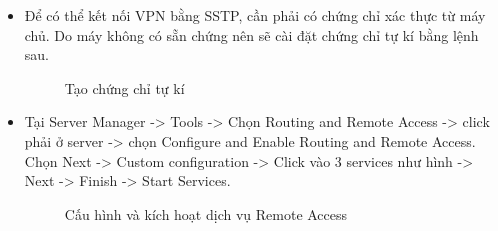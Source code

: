 \begin{itemize}
    \item Để có thể kết nối VPN bằng SSTP, cần phải có chứng chỉ xác thực từ máy chủ. Do máy không có sẵn chứng nên sẽ cài đặt chứng chỉ tự kí bằng lệnh sau.
    \begin{figure}[htbp]
            \hfill
            \hfill
            \caption{Tạo chứng chỉ tự kí}
        \end{figure}
    \item Tại Server Manager -> Tools -> Chọn Routing and Remote Access -> click phải ở server -> chọn Configure and Enable Routing and Remote Access. Chọn Next -> Custom configuration -> Click vào 3 services như hình -> Next -> Finish -> Start Services.
    
        \begin{figure}[htbp]
            \hfill
            \hfill
            \caption{Cấu hình và kích hoạt dịch vụ Remote Access}
        \end{figure}


\end{itemize}
